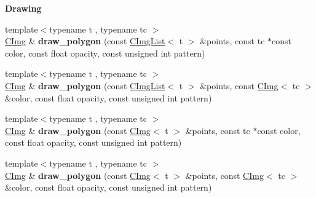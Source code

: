 \begin{Indent}{\bf Drawing}
\begin{DoxyCompactItemize}
\item 
\hypertarget{structcimg__library_1_1_c_img_a8d20611a1e851c1aea5007f54ba7ad9c}{{\footnotesize template$<$typename t , typename tc $>$ }\\\hyperlink{structcimg__library_1_1_c_img}{C\-Img} \& {\bfseries draw\-\_\-polygon} (const \hyperlink{structcimg__library_1_1_c_img_list}{C\-Img\-List}$<$ t $>$ \&points, const tc $\ast$const color, const float opacity, const unsigned int pattern)}\label{structcimg__library_1_1_c_img_a8d20611a1e851c1aea5007f54ba7ad9c}

\item 
\hypertarget{structcimg__library_1_1_c_img_affa18bb6dd186f3db59d2f9c51ab113e}{{\footnotesize template$<$typename t , typename tc $>$ }\\\hyperlink{structcimg__library_1_1_c_img}{C\-Img} \& {\bfseries draw\-\_\-polygon} (const \hyperlink{structcimg__library_1_1_c_img_list}{C\-Img\-List}$<$ t $>$ \&points, const \hyperlink{structcimg__library_1_1_c_img}{C\-Img}$<$ tc $>$ \&color, const float opacity, const unsigned int pattern)}\label{structcimg__library_1_1_c_img_affa18bb6dd186f3db59d2f9c51ab113e}

\item 
\hypertarget{structcimg__library_1_1_c_img_ac839b26c6fc0126193b41d795b796269}{{\footnotesize template$<$typename t , typename tc $>$ }\\\hyperlink{structcimg__library_1_1_c_img}{C\-Img} \& {\bfseries draw\-\_\-polygon} (const \hyperlink{structcimg__library_1_1_c_img}{C\-Img}$<$ t $>$ \&points, const tc $\ast$const color, const float opacity, const unsigned int pattern)}\label{structcimg__library_1_1_c_img_ac839b26c6fc0126193b41d795b796269}

\item 
\hypertarget{structcimg__library_1_1_c_img_ada651c1d9be47ff34eae30aca59424ec}{{\footnotesize template$<$typename t , typename tc $>$ }\\\hyperlink{structcimg__library_1_1_c_img}{C\-Img} \& {\bfseries draw\-\_\-polygon} (const \hyperlink{structcimg__library_1_1_c_img}{C\-Img}$<$ t $>$ \&points, const \hyperlink{structcimg__library_1_1_c_img}{C\-Img}$<$ tc $>$ \&color, const float opacity, const unsigned int pattern)}\label{structcimg__library_1_1_c_img_ada651c1d9be47ff34eae30aca59424ec}


\end{DoxyCompactItemize}
\end{Indent}
